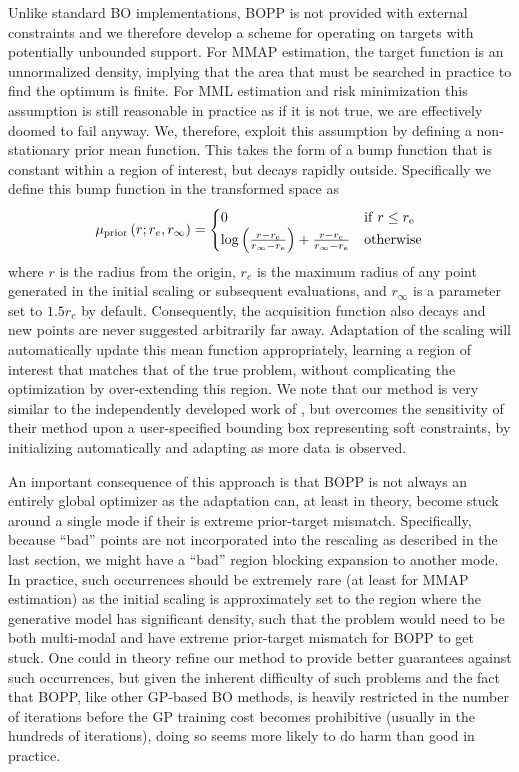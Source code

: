 Unlike standard BO implementations, BOPP is not provided with external constraints and we therefore 
develop a scheme for operating on targets with potentially unbounded support.  For MMAP estimation,
the target function is an unnormalized density, implying that the area that must 
be searched in practice to find the optimum is finite.  For MML estimation and risk minimization this
assumption is still reasonable in practice as if it is not true, we are effectively doomed to fail anyway.
We, therefore, exploit this assumption by defining a non-stationary prior mean function.  
This takes the form of a bump function that is constant within a region of interest, but decays rapidly 
outside.  Specifically we define this bump function in the transformed space as
\begin{align}
\label{eq:BUMP}
\mu_{\mathrm{prior}}\left(r;r_e,r_{\mathrm{\infty}}\right) = \begin{cases} 0  \hfill & \mathrm{if} \; r \leq r_{\mathrm{e}} \\ 
\log \left(\frac{r-r_{\mathrm{e}}}{r_{\mathrm{\infty}}-r_{\mathrm{e}}}\right)+\frac{r-r_{\mathrm{e}}}{r_{\mathrm{\infty}}-r_{\mathrm{e}}} & \mathrm{otherwise} \end{cases}
\end{align}
where $r$ is the radius from the origin, $r_e$ is the maximum radius of any point generated 
in the initial scaling or subsequent evaluations, and $r_{\mathrm{\infty}}$ is a parameter 
set to $1.5 r_{e}$ by default.  Consequently, the acquisition function also decays and new points 
are never suggested arbitrarily far away.  Adaptation of the scaling will automatically update this 
mean function appropriately, learning a region of interest that matches that of the true problem, 
without complicating the optimization by over-extending this region.  We note that our method 
is very similar to the independently developed work of \cite{shahriari2016unbounded}, but overcomes the 
sensitivity of their method upon a user-specified bounding box representing soft constraints, 
by initializing automatically and adapting as more data is observed.

An important consequence of this approach is that BOPP is not always an entirely
global optimizer as the adaptation can, at least in theory, become stuck around a single mode if
their is extreme prior-target mismatch.  Specifically, because ``bad'' points 
are not incorporated into the rescaling as described in the last
section, we might have a ``bad'' region blocking expansion to another mode.
In practice, such occurrences should be extremely rare (at least for MMAP estimation) as the
initial scaling is approximately set to the region where the generative model has significant density, such that
the problem would need to be both multi-modal and have extreme prior-target mismatch for BOPP to
get stuck.  One could in theory refine our method to provide better guarantees against such occurrences,
but given the inherent difficulty of such problems and the fact that BOPP, like other GP-based BO methods,
is heavily restricted in the number of iterations before the GP training cost becomes
prohibitive (usually in the hundreds of iterations), doing so seems more likely to do harm than good in practice.